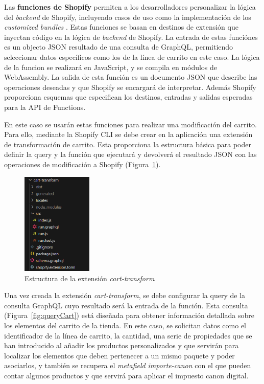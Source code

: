 \documentclass[12pt]{article}
\begin{document}
Las \textbf{funciones de Shopify} \cite{shopify-functions} permiten a los desarrolladores personalizar la lógica del \textit{backend} de Shopify, incluyendo casos de uso como la implementación de los
\textit{customized bundles} \cite{paquete-personalizado}. Estas funciones se basan en destinos de extensión que inyectan código en la lógica de \textit{backend} de Shopify. La entrada de estas funciónes es un objecto JSON resultado de una
consulta de GraphQL, permitiendo seleccionar datos específicos como los de la línea de carrito en este caso. La lógica de la funcion se realizará en JavaScript, y se compila en módulos de WebAssembly.
La salida de esta función es un documento JSON que describe las operaciones deseadas y que Shopify se encargará de interpretar. Además Shopify proporciona esquemas que especifican los 
destinos, entradas y salidas esperadas para la API de Functions.

En este caso se usarán estas funciones para realizar una modificación del carrito. Para ello, mediante la Shopify CLI se debe crear en la aplicación una extensión de transformación de carrito. Esta proporciona 
la estructura básica para poder definir la query y la función que ejecutará y devolverá el resultado JSON con las operaciones de modificación a Shopify (Figura~\ref{fig:estructuracarttrans}). 

\begin{figure}[ht]
    \centering
    \includegraphics[width=0.3\textwidth]{imagenes-tema/estructuraCartTransform.png}
    \caption{\label{fig:estructuracarttrans} Estructura de la extensión \textit{cart-transform}}
    \vspace{\fill}
\end{figure}

Una vez creada la extensión \textit{cart-transform}, se debe configurar la query de la consulta GraphQL cuyo resultado será la entrada de la función. Esta consulta (Figura~\ref{fig:queryCart}) está diseñada para obtener
información detallada sobre los elementos del carrito de la tienda. En este caso, se solicitan datos como el identificador de la línea de carrito, la cantidad, una serie de propiedades que se han introducido al añadir los productos personalizados 
y que servirán para localizar los elementos que deben pertenecer a un mismo paquete y poder asociarlos, y también se recupera el 
\textit{metafield} \textit{importe-canon} con el que pueden contar algunos productos y que servirá para aplicar el impuesto canon digital.
\end{document}
